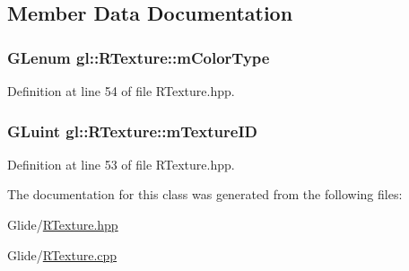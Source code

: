 \subsection{Member Data Documentation}
\hypertarget{classgl_1_1_r_texture_a0442b6e57cd493fa02b2167658785fe4}{
\subsubsection[{m\-Color\-Type}]{\setlength{\rightskip}{0pt plus 5cm}G\-Lenum gl\-::\-R\-Texture\-::m\-Color\-Type\hspace{0.3cm}{\ttfamily [protected]}}}\label{classgl_1_1_r_texture_a0442b6e57cd493fa02b2167658785fe4}


Definition at line 54 of file R\-Texture.\-hpp.

\hypertarget{classgl_1_1_r_texture_ac09f29aa4942ab525d65c98217be05ac}{
\subsubsection[{m\-Texture\-I\-D}]{\setlength{\rightskip}{0pt plus 5cm}G\-Luint gl\-::\-R\-Texture\-::m\-Texture\-I\-D\hspace{0.3cm}{\ttfamily [protected]}}}\label{classgl_1_1_r_texture_ac09f29aa4942ab525d65c98217be05ac}


Definition at line 53 of file R\-Texture.\-hpp.



The documentation for this class was generated from the following files\-:\begin{DoxyCompactItemize}
\item 
Glide/\hyperlink{_r_texture_8hpp}{R\-Texture.\-hpp}\item 
Glide/\hyperlink{_r_texture_8cpp}{R\-Texture.\-cpp}\end{DoxyCompactItemize}
